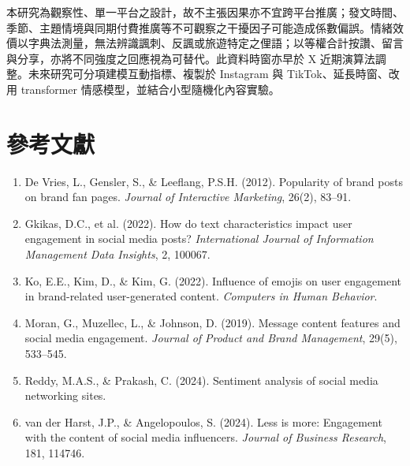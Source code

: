 \documentclass[12pt,a4paper]{ctexart}
\begin{document}
本研究為觀察性、單一平台之設計，故不主張因果亦不宜跨平台推廣；發文時間、季節、主題情境與同期付費推廣等不可觀察之干擾因子可能造成係數偏誤。情緒效價以字典法測量，無法辨識諷刺、反諷或旅遊特定之俚語；以等權合計按讚、留言與分享，亦將不同強度之回應視為可替代。此資料時窗亦早於 X 近期演算法調整。未來研究可分項建模互動指標、複製於 Instagram 與 TikTok、延長時窗、改用 transformer 情感模型，並結合小型隨機化內容實驗。

\section*{參考文獻}

\begin{enumerate}[leftmargin=1.5em]
    \item De Vries, L., Gensler, S., \& Leeflang, P.S.H. (2012). Popularity of brand posts on brand fan pages. \textit{Journal of Interactive Marketing}, 26(2), 83--91.
    \item Gkikas, D.C., et al. (2022). How do text characteristics impact user engagement in social media posts? \textit{International Journal of Information Management Data Insights}, 2, 100067.
    \item Ko, E.E., Kim, D., \& Kim, G. (2022). Influence of emojis on user engagement in brand-related user-generated content. \textit{Computers in Human Behavior}.
    \item Moran, G., Muzellec, L., \& Johnson, D. (2019). Message content features and social media engagement. \textit{Journal of Product and Brand Management}, 29(5), 533--545.
    \item Reddy, M.A.S., \& Prakash, C. (2024). Sentiment analysis of social media networking sites.
    \item van der Harst, J.P., \& Angelopoulos, S. (2024). Less is more: Engagement with the content of social media influencers. \textit{Journal of Business Research}, 181, 114746.
\end{enumerate}
\end{document}
